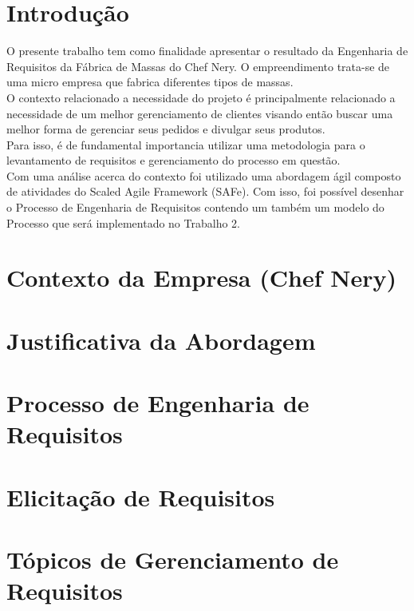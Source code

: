 \newcommand\tab[1][1cm]{\hspace*{#1}}

\section{Introdução}\label{sec}
\tab O presente trabalho tem como finalidade apresentar o resultado da Engenharia de Requisitos da Fábrica de Massas do Chef Nery. O empreendimento trata-se de uma micro empresa que fabrica diferentes tipos de massas.\\
\tab O contexto relacionado a necessidade do projeto é principalmente relacionado a necessidade de um melhor gerenciamento de clientes visando então buscar uma melhor forma de gerenciar seus pedidos e divulgar seus produtos.\\
\tab Para isso, é de fundamental importancia utilizar uma metodologia para o levantamento de requisitos e gerenciamento do processo em questão.\\
\tab Com uma análise acerca do contexto foi utilizado uma abordagem ágil composto de atividades do Scaled Agile Framework (SAFe). Com isso, foi possível desenhar o Processo de Engenharia de Requisitos contendo um também um modelo do Processo que será implementado no Trabalho 2.


\section{Contexto da Empresa (Chef Nery)} %
\label{sec:nova_sess_o}

\section{Justificativa da Abordagem}
\label{sec:nova_sess_o}

\section{Processo de Engenharia de Requisitos}
\label{sec:nova_sess_o}

\section{Elicitação de Requisitos}
\label{sec:nova_sess_o}

\section{Tópicos de Gerenciamento de Requisitos}
\label{sec:nova_sess_o}

